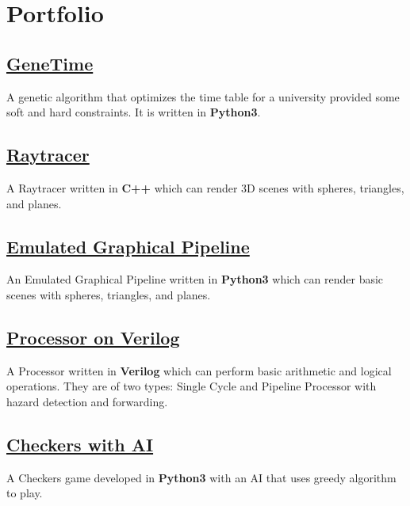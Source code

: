 \documentclass[]{resume}
\begin{document}
\begin{minipage}[t]{0.5\textwidth}

    \section{Portfolio}

    \subsection{\href{https://github.com/Qazalbash/GeneTime}{\textbf{GeneTime}}}
    A genetic algorithm that optimizes the time table for a university provided some soft and hard constraints. It is written in \textbf{Python3}.

    \subsection{\href{https://github.com/Qazalbash/Raytracer}{\textbf{Raytracer}}}%
    A Raytracer written in \textbf{C++} which can render 3D scenes with spheres, triangles, and planes.

    \subsection{\href{https://github.com/Qazalbash/Emulated-Graphical-Pipeline}{
            \textbf{Emulated Graphical Pipeline}}}%
    An Emulated Graphical Pipeline written in \textbf{Python3} which can render basic scenes with spheres, triangles, and planes.

    \subsection{\href{https://github.com/Qazalbash/Processor-on-Verilog}{\textbf{Processor on Verilog}}}
    A Processor written in \textbf{Verilog} which can perform basic arithmetic and logical operations. They are of two types: Single Cycle and Pipeline Processor with hazard detection and forwarding.

    \subsection{\href{https://github.com/Qazalbash/Checkers-with-AI}{\textbf{Checkers with AI}}}%
    A Checkers game developed in \textbf{Python3} with an AI that uses greedy algorithm to play.


\end{minipage}
\end{document}
